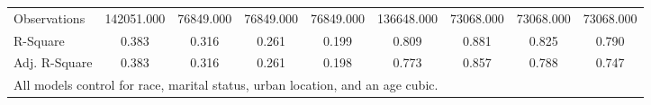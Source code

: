 \begin{table}
\begin{tabular}{l*{8}{c}}
\hline
Observations        &  142051.000         &   76849.000         &   76849.000         &   76849.000         &  136648.000         &   73068.000         &   73068.000         &   73068.000         \\
R-Square            &       0.383         &       0.316         &       0.261         &       0.199         &       0.809         &       0.881         &       0.825         &       0.790         \\
Adj. R-Square       &       0.383         &       0.316         &       0.261         &       0.198         &       0.773         &       0.857         &       0.788         &       0.747         \\
\hline
\multicolumn{9}{l}{\small{All models control for race, marital status, urban location, and an age cubic.}} \\
\end{tabular}
\end{table}

